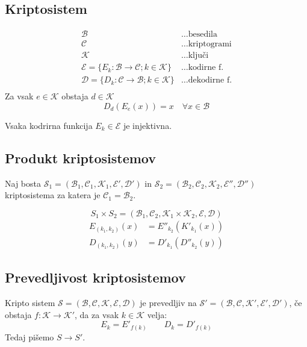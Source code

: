 
 

\begin{multicols}{5}
\setlength{\premulticols}{1pt}
\setlength{\postmulticols}{1pt}
\setlength{\multicolsep}{1pt}
\setlength{\columnsep}{2pt}

\section*{Kriptosistem}
\begin{align*}
	\mathcal{B} &\dots \text{besedila} \\
	\mathcal{C} &\dots \text{kriptogrami} \\
	\mathcal{K} &\dots \text{ključi} \\
	\mathcal{E} = \{E_k : \mathcal{B} \to \mathcal{C}; k \in \mathcal{K} \} &\dots \text{kodirne f.} \\
	\mathcal{D} = \{D_k : \mathcal{C} \to \mathcal{B}; k \in \mathcal{K} \} &\dots \text{dekodirne f.} \\
\end{align*}
Za vsak $e \in \mathcal{K}$ obstaja $d \in \mathcal{K}$
\[ D_d(E_e(x)) = x \quad \forall x \in \mathcal{B}\]

Vsaka kodrirna funkcija $E_k \in \mathcal{E}$ je injektivna.

\subsection*{Produkt kriptosistemov}
Naj bosta $\mathcal{S}_1 = (\mathcal{B}_1, \mathcal{C}_1, \mathcal{K}_1, \mathcal{E}', \mathcal{D}')$ in 
$\mathcal{S}_2 = (\mathcal{B}_2, \mathcal{C}_2, \mathcal{K}_2, \mathcal{E}'', \mathcal{D}'')$ kriptosistema za katera
je $\mathcal{C}_1 = \mathcal{B}_2$.

\[ S_1 \times S_2 = (\mathcal{B}_1, \mathcal{C}_2, \mathcal{K}_1 \times \mathcal{K}_2, \mathcal{E}, \mathcal{D})\]
\begin{align*}
	E_{(k_1, k_2)} (x) &= E''_{k_2}(K'_{k_1}(x)) \\
	D_{(k_1, k_2)} (y) &= D'_{k_1}(D''_{k_2}(y))
\end{align*}

\subsection*{Prevedljivost kriptosistemov}
Kripto sistem $\mathcal{S} = (\mathcal{B}, \mathcal{C}, \mathcal{K}, \mathcal{E}, \mathcal{D})$ je prevedljiv na
$\mathcal{S}' = (\mathcal{B}, \mathcal{C}, \mathcal{K}', \mathcal{E}', \mathcal{D}')$, če obstaja $f: \mathcal{K} \to \mathcal{K}'$, 
da za vsak $k \in \mathcal{K}$ velja:
\[ E_k = E'_{f(k)} \qquad D_k = D'_{f(k)} \]
Tedaj pišemo $S \to S'$.


\end{multicols}
